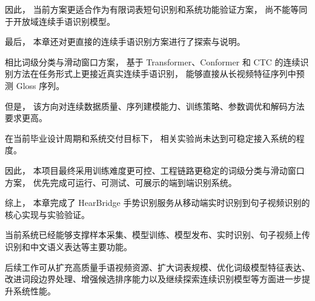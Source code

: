 因此，
当前方案更适合作为有限词表短句识别和系统功能验证方案，
尚不能等同于开放域连续手语识别模型。

最后，
本章还对更直接的连续手语识别方案进行了探索与说明。

相比词级分类与滑动窗口方案，
基于 Transformer、Conformer 和 CTC 的连续识别方法在任务形式上更接近真实连续手语识别，
能够直接从长视频特征序列中预测 Gloss 序列。

但是，
该方向对连续数据质量、序列建模能力、训练策略、参数调优和解码方法要求更高。

在当前毕业设计周期和系统交付目标下，
相关实验尚未达到可稳定接入系统的程度。

因此，
本项目最终采用训练难度更可控、工程链路更稳定的词级分类与滑动窗口方案，
优先完成可运行、可测试、可展示的端到端识别系统。

综上，
本章完成了 HearBridge 手势识别服务从移动端实时识别到句子视频识别的核心实现与实验验证。

当前系统已经能够支撑样本采集、模型训练、模型发布、实时识别、句子视频上传识别和中文语义表达等主要功能。

后续工作可从扩充高质量手语视频资源、扩大词表规模、优化词级模型特征表达、改进词段边界处理、增强候选排序能力以及继续探索连续识别模型等方面进一步提升系统性能。